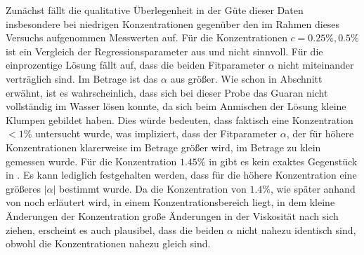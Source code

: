 \documentclass[11pt,a4paper,oneside]{scrartcl}
\begin{document}
Zunächst fällt die qualitative Überlegenheit in der Güte dieser Daten insbesondere bei niedrigen Konzentrationen gegenüber den im Rahmen dieses Versuchs aufgenommen Messwerten auf. Für die Konzentrationen $c=0.25\%,0.5\%$ ist ein Vergleich der Regressionsparameter aus  und  nicht sinnvoll. Für die einprozentige Lösung fällt auf, dass die beiden Fitparameter $\alpha$ nicht miteinander verträglich sind. Im Betrage ist das $\alpha$ aus  größer. Wie schon in Abschnitt \label{anmischen_guaran} erwähnt, ist es wahrscheinlich, dass sich bei dieser Probe das Guaran nicht vollständig im Wasser lösen konnte, da sich beim Anmischen der Lösung kleine Klumpen gebildet haben. Dies würde bedeuten, dass faktisch eine Konzentration $<1\%$ untersucht wurde, was impliziert, dass der Fitparameter $\alpha$, der für höhere Konzentrationen klarerweise im Betrage größer wird, im Betrage zu klein gemessen wurde. Für die Konzentration $1.45\%$ in  gibt es kein exaktes Gegenstück in . Es kann lediglich festgehalten werden, dass für die höhere Konzentration eine größeres $|\alpha|$ bestimmt wurde. Da die Konzentration von $1.4\%$, wie später anhand von  noch erläutert wird, in einem Konzentrationsbereich liegt, in dem kleine Änderungen der Konzentration große Änderungen in der Viskosität nach sich ziehen,  erscheint es auch plausibel, dass die beiden $\alpha$ nicht nahezu identisch sind, obwohl die Konzentrationen nahezu gleich sind.




\par
\end{document}

